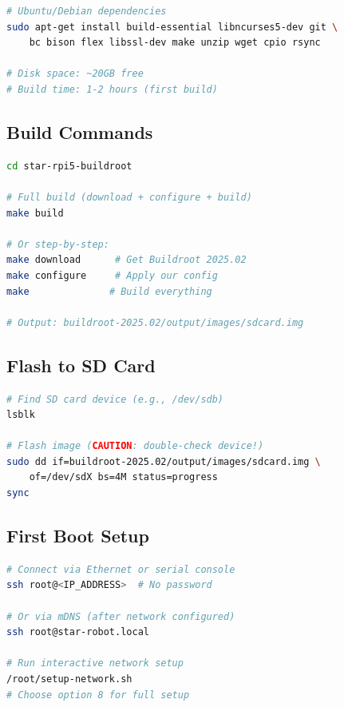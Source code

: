 \documentclass[11pt,letterpaper]{article}
\begin{document}
\begin{lstlisting}[language=bash]
# Ubuntu/Debian dependencies
sudo apt-get install build-essential libncurses5-dev git \
    bc bison flex libssl-dev make unzip wget cpio rsync

# Disk space: ~20GB free
# Build time: 1-2 hours (first build)
\end{lstlisting}

\subsection{Build Commands}

\begin{lstlisting}[language=bash]
cd star-rpi5-buildroot

# Full build (download + configure + build)
make build

# Or step-by-step:
make download      # Get Buildroot 2025.02
make configure     # Apply our config
make              # Build everything

# Output: buildroot-2025.02/output/images/sdcard.img
\end{lstlisting}

\subsection{Flash to SD Card}

\begin{lstlisting}[language=bash]
# Find SD card device (e.g., /dev/sdb)
lsblk

# Flash image (CAUTION: double-check device!)
sudo dd if=buildroot-2025.02/output/images/sdcard.img \
    of=/dev/sdX bs=4M status=progress
sync
\end{lstlisting}

\subsection{First Boot Setup}

\begin{lstlisting}[language=bash]
# Connect via Ethernet or serial console
ssh root@<IP_ADDRESS>  # No password

# Or via mDNS (after network configured)
ssh root@star-robot.local

# Run interactive network setup
/root/setup-network.sh
# Choose option 8 for full setup
\end{lstlisting}

\end{document}
